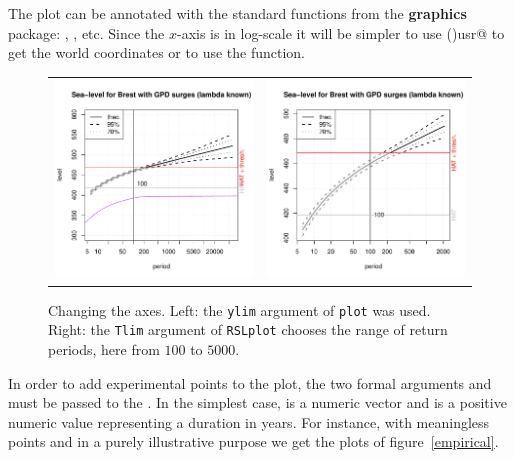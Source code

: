 \documentclass[11pt,a4paper]{report}\usepackage[]{graphicx}\usepackage[]{color}
\begin{document}
\noindent
The plot can be annotated with the standard functions from the
\textbf{graphics} package: \verb@text@, \verb@lines@, etc.  Since the
$x$-axis is in log-scale it will be simpler to use \verb@par()usr@ to
get the world coordinates or to use the \verb@locator@ function.

\begin{figure}
   \centering
   \begin{tabular}{c c} 
     \includegraphics[width=7.4cm]{Rgraphics/figBrestConv3-1.pdf} &
     \includegraphics[width=7.4cm]{Rgraphics/figBrestConv4-1.pdf} 
   \end{tabular}
   \caption{\label{BrestSurge3} Changing the axes. Left: the
     \texttt{ylim} argument of \texttt{plot} was used. Right: the
     \texttt{Tlim} argument of \texttt{RSLplot} chooses the range of
     return periods, here from $100$ to $5000$.}
\end{figure}

In order to add experimental points to the plot, the two formal
arguments 
\verb@z@ and \verb@duration@ must be passed to the \verb@RSLplot@.  In
the simplest case, \verb@z@ is a numeric vector and \verb@duration@ is
a positive numeric value representing a duration in years. 
\label{EMPPOINTS} For instance, with meaningless points and in 
a purely illustrative purpose we get the plots of figure~\ref{empirical}.
\end{document}
